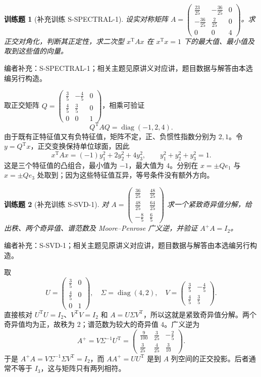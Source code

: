 \documentclass[UTF8,12pt,a4paper,fontset=fandol]{ctexart}
\newtheorem{exercise}{训练题}[section]
\begin{document}
\begin{exercise}[补充训练 S-SPECTRAL-1]\label{prob:S-SPECTRAL-1}
设实对称矩阵 $A=\begin{pmatrix}\frac{23}{25}&-\frac{36}{25}&0\\-\frac{36}{25}&\frac{2}{25}&0\\0&0&4\end{pmatrix}$。求正交对角化，判断其正定性，求二次型 $x^{\mathrm T}Ax$ 在 $x^{\mathrm T}x=1$ 下的最大值、最小值及取到这些值的向量。
\end{exercise}
\noindent 编者补充：S-SPECTRAL-1；相关主题见原讲义对应讲，题目数据与解答由本选编另行构造。
\begin{solve}
取正交矩阵 $Q=\begin{pmatrix}\frac{3}{5}&-\frac{4}{5}&0\\\frac{4}{5}&\frac{3}{5}&0\\0&0&1\end{pmatrix}$，相乘可验证
\[Q^{\mathrm T}AQ=\operatorname{diag}(-1,2,4).\]
由于既有正特征值又有负特征值，矩阵不定，正、负惯性指数分别为 $2,1$。令 $y=Q^{\mathrm T}x$，正交变换保持单位球面，因此
\[x^{\mathrm T}Ax=(-1)y_1^2+2y_2^2+4y_3^2,\qquad y_1^2+y_2^2+y_3^2=1.\]
这是三个特征值的凸组合，最小值为 $-1$，最大值为 $4$。分别在 $x=\pm Qe_1$ 与 $x=\pm Qe_3$ 处取到；因为这些特征值互异，等号条件没有额外方向。
\end{solve}

\begin{exercise}[补充训练 S-SVD-1]\label{prob:S-SVD-1}
对 $A=\begin{pmatrix}\frac{36}{25}&\frac{48}{25}\\\frac{48}{25}&\frac{64}{25}\\-\frac{8}{5}&\frac{6}{5}\end{pmatrix}$ 求一个紧致奇异值分解，给出秩、两个奇异值、谱范数及 Moore--Penrose 广义逆，并验证 $A^+A=I_2$。
\end{exercise}
\noindent 编者补充：S-SVD-1；相关主题见原讲义对应讲，题目数据与解答由本选编另行构造。
\begin{solve}
取
\[U=\begin{pmatrix}\frac{3}{5}&0\\\frac{4}{5}&0\\0&1\end{pmatrix},\quad\Sigma=\operatorname{diag}(4,2),\quad V=\begin{pmatrix}\frac{3}{5}&-\frac{4}{5}\\\frac{4}{5}&\frac{3}{5}\end{pmatrix}.\]
直接核对 $U^{\mathrm T}U=I_2$、$V^{\mathrm T}V=I_2$ 和 $A=U\Sigma V^{\mathrm T}$，所以这就是紧致奇异值分解。两个奇异值均为正，故秩为 $2$；谱范数为较大的奇异值 $4$。广义逆为
\[A^+=V\Sigma^{-1}U^{\mathrm T}=\begin{pmatrix}\frac{9}{100}&\frac{3}{25}&-\frac{2}{5}\\\frac{3}{25}&\frac{4}{25}&\frac{3}{10}\end{pmatrix}.\]
于是 $A^+A=V\Sigma^{-1}\Sigma V^{\mathrm T}=I_2$，而 $AA^+=UU^{\mathrm T}$ 是到 $A$ 列空间的正交投影。后者通常不等于 $I_3$，这与矩阵只有两列相符。
\end{solve}
\end{document}
